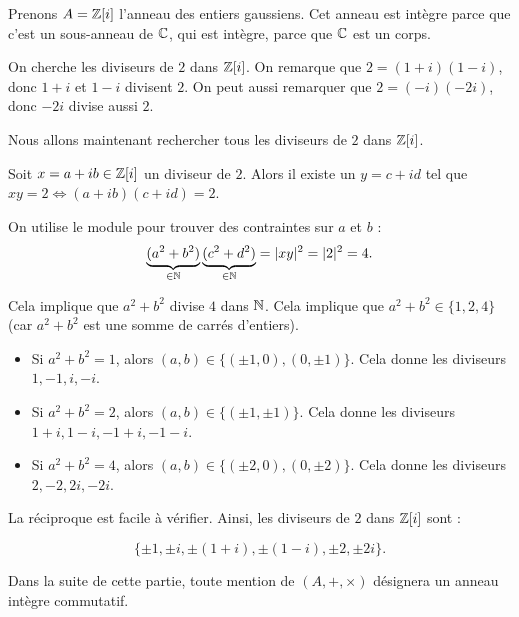 \documentclass[12pt, a4paper]{report}
\begin{document}
\begin{example}
    Prenons $A=\mathbb{Z}[i]$ l'anneau des entiers gaussiens. Cet anneau est intègre parce que c'est un sous-anneau de $\mathbb{C}$, qui est intègre, parce que $\mathbb{C}$ est un corps.

    On cherche les diviseurs de $2$ dans $\mathbb{Z}[i]$. On remarque que $2 = (1+i)(1-i)$, donc $1+i$ et $1-i$ divisent $2$. On peut aussi remarquer que $2 = (-i)(-2i)$, donc $-2i$ divise aussi $2$.

    Nous allons maintenant rechercher tous les diviseurs de $2$ dans $\mathbb{Z}[i]$.

    Soit $x=a+ib \in \mathbb{Z}[i]$ un diviseur de $2$. Alors il existe un $y = c+id$ tel que $xy=2 \iff (a+ib)(c+id)=2$.

    On utilise le module pour trouver des contraintes sur $a$ et $b$ :
    \[
        \underbrace{(a^2+b^2)}_{\in\mathbb{N}}\underbrace{(c^2+d^2)}_{\in\mathbb{N}} = |xy|^2 = |2|^2 = 4.
    \]

    Cela implique que $a^2+b^2$ divise $4$ dans $\mathbb{N}$. Cela implique que $a^2+b^2 \in \{1,2,4\}$ (car $a^2+b^2$ est une somme de carrés d'entiers).

    \begin{itemize}
        \item Si $a^2+b^2=1$, alors $(a,b) \in \{(\pm 1,0),(0,\pm 1)\}$. Cela donne les diviseurs $1,-1,i,-i$.
        \item Si $a^2+b^2=2$, alors $(a,b) \in \{(\pm 1,\pm 1)\}$. Cela donne les diviseurs $1+i, 1-i, -1+i, -1-i$.
        \item Si $a^2+b^2=4$, alors $(a,b) \in \{(\pm 2,0),(0,\pm 2)\}$. Cela donne les diviseurs $2,-2,2i,-2i$.
    \end{itemize}

    La réciproque est facile à vérifier. Ainsi, les diviseurs de $2$ dans $\mathbb{Z}[i]$ sont :

    \[
        \{\pm 1, \pm i, \pm (1+i), \pm (1-i), \pm 2, \pm 2i\}.
    \]
\end{example}

\begin{importantbox}
    Dans la suite de cette partie, toute mention de $(A,+,\times)$ désignera un anneau intègre commutatif.
\end{importantbox}
\end{document}
